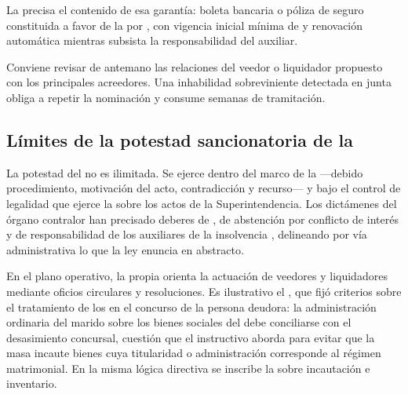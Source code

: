 La  \citeyearpar{ncg-10} precisa el contenido de esa garantía: boleta bancaria o póliza de
seguro constituida a favor de la \superir{} por , con vigencia inicial mínima
de  y renovación automática mientras subsista la responsabilidad del
auxiliar.

\begin{practica}
Conviene revisar de antemano las relaciones del veedor o liquidador propuesto con los
principales acreedores. Una inhabilidad sobreviniente detectada en junta obliga a repetir
la nominación y consume semanas de tramitación.
\end{practica}

\bloqueJurisprudencial

\subsection{Límites de la potestad sancionatoria de la \superir{}}

La potestad del  no es ilimitada. Se ejerce dentro del marco de la
 ---debido procedimiento,
motivación del acto, contradicción y recurso--- y bajo el control de legalidad que ejerce la
 sobre los actos de la Superintendencia. Los
dictámenes del órgano contralor han precisado deberes de , de abstención por
conflicto de interés y de responsabilidad de los auxiliares de la insolvencia
\parencite{contraloria-superir-dictamenes}, delineando por vía administrativa lo que la ley
enuncia en abstracto.

En el plano operativo, la propia \superir{} orienta la actuación de veedores y liquidadores
mediante oficios circulares y resoluciones. Es ilustrativo el
\textcite{oficio-circular-superir-5-2020}, que fijó criterios sobre el tratamiento de los
 en el concurso de la persona deudora: la
administración ordinaria del marido sobre los bienes sociales del  debe conciliarse
con el desasimiento concursal, cuestión que el instructivo aborda para evitar que la masa incaute
bienes cuya titularidad o administración corresponde al régimen matrimonial. En la misma lógica
directiva se inscribe la \textcite{resolucion-superir-520} sobre incautación e inventario.

